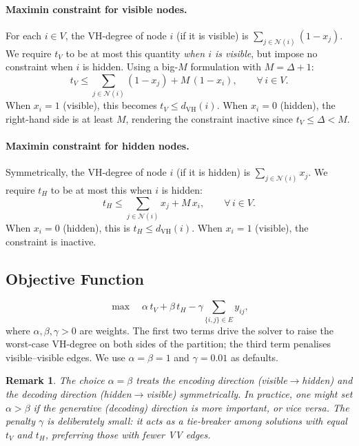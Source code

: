 \documentclass[11pt,a4paper]{article}
\newtheorem{remark}{Remark}
\newcommand{\N}{\mathcal{N}}
\begin{document}
\paragraph{Maximin constraint for visible nodes.}  For each $i\in V$, the VH-degree of node $i$ (if it is visible) is $\sum_{j\in\N(i)}(1-x_j)$.  We require $t_V$ to be at most this quantity \emph{when $i$ is visible}, but impose no constraint when $i$ is hidden.  Using a big-$M$ formulation with $M = \Delta + 1$:
\begin{equation}\label{eq:tvcons}
  t_V \leq \sum_{j\in\N(i)} (1 - x_j) + M\,(1 - x_i), \qquad \forall\,i\in V.
\end{equation}
When $x_i=1$ (visible), this becomes $t_V \leq d_{\mathrm{VH}}(i)$.  When $x_i=0$ (hidden), the right-hand side is at least $M$, rendering the constraint inactive since $t_V \leq \Delta < M$.

\paragraph{Maximin constraint for hidden nodes.}  Symmetrically, the VH-degree of node $i$ (if it is hidden) is $\sum_{j\in\N(i)} x_j$.  We require $t_H$ to be at most this when $i$ is hidden:
\begin{equation}\label{eq:thcons}
  t_H \leq \sum_{j\in\N(i)} x_j + M\,x_i, \qquad \forall\,i\in V.
\end{equation}
When $x_i=0$ (hidden), this is $t_H \leq d_{\mathrm{VH}}(i)$.  When $x_i=1$ (visible), the constraint is inactive.

\subsection{Objective Function}

\begin{equation}\label{eq:obj}
  \max \quad \alpha\,t_V + \beta\,t_H - \gamma \sum_{\{i,j\}\in E} y_{ij},
\end{equation}
where $\alpha, \beta, \gamma > 0$ are weights.  The first two terms drive the solver to raise the worst-case VH-degree on both sides of the partition; the third term penalises visible--visible edges.  We use $\alpha = \beta = 1$ and $\gamma = 0.01$ as defaults.

\begin{remark}
The choice $\alpha = \beta$ treats the encoding direction (visible$\to$hidden) and the decoding direction (hidden$\to$visible) symmetrically.  In practice, one might set $\alpha > \beta$ if the generative (decoding) direction is more important, or vice versa.  The penalty $\gamma$ is deliberately small: it acts as a tie-breaker among solutions with equal $t_V$ and $t_H$, preferring those with fewer VV edges.
\end{remark}
\end{document}

